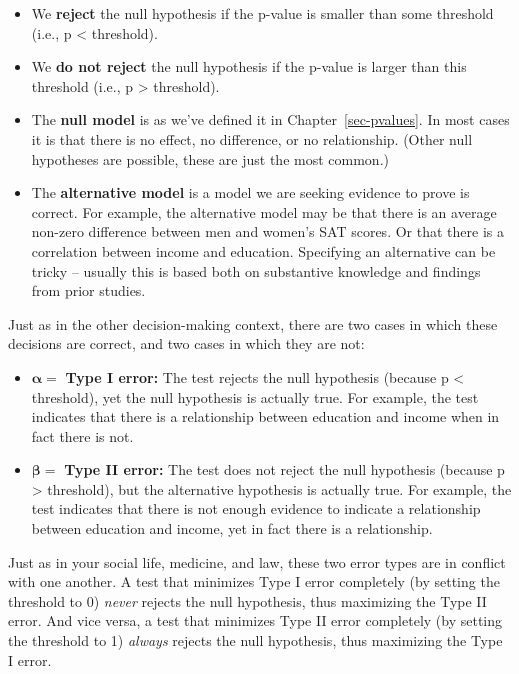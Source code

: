 \documentclass[
  letterpaper,
  DIV=11,
  numbers=noendperiod]{scrreprt}
\providecommand{\tightlist}{%
  \setlength{\itemsep}{0pt}\setlength{\parskip}{0pt}}\usepackage{longtable,booktabs,array}
\theoremstyle{definition}
\theoremstyle{remark}
\begin{document}
\begin{itemize}
\tightlist
\item
  We \textbf{reject} the null hypothesis if the p-value is smaller than
  some threshold (i.e., p \textless{} threshold).
\item
  We \textbf{do not reject} the null hypothesis if the p-value is larger
  than this threshold (i.e., p \textgreater{} threshold).
\item
  The \textbf{null model} is as we've defined it in
  Chapter~\ref{sec-pvalues}. In most cases it is that there is no
  effect, no difference, or no relationship. (Other null hypotheses are
  possible, these are just the most common.)
\item
  The \textbf{alternative model} is a model we are seeking evidence to
  prove is correct. For example, the alternative model may be that there
  is an average non-zero difference between men and women's SAT scores.
  Or that there is a correlation between income and education.
  Specifying an alternative can be tricky -- usually this is based both
  on substantive knowledge and findings from prior studies.
\end{itemize}

Just as in the other decision-making context, there are two cases in
which these decisions are correct, and two cases in which they are not:

\begin{itemize}
\tightlist
\item
  \(\boldsymbol{\alpha} =\) \textbf{Type I error:} The test rejects the
  null hypothesis (because p \textless{} threshold), yet the null
  hypothesis is actually true. For example, the test indicates that
  there is a relationship between education and income when in fact
  there is not.
\item
  \(\boldsymbol{\beta =}\) \textbf{Type II error:} The test does not
  reject the null hypothesis (because p \textgreater{} threshold), but
  the alternative hypothesis is actually true. For example, the test
  indicates that there is not enough evidence to indicate a relationship
  between education and income, yet in fact there is a relationship.
\end{itemize}

Just as in your social life, medicine, and law, these two error types
are in conflict with one another. A test that minimizes Type I error
completely (by setting the threshold to 0) \emph{never} rejects the null
hypothesis, thus maximizing the Type II error. And vice versa, a test
that minimizes Type II error completely (by setting the threshold to 1)
\emph{always} rejects the null hypothesis, thus maximizing the Type I
error.
\end{document}
